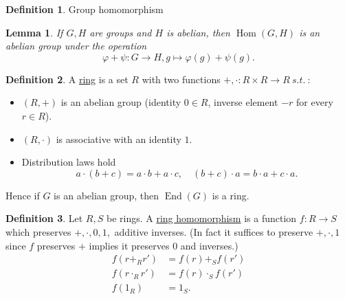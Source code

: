 \documentclass{article}
\newcommand{\st}{\ s.t.\ }
\def \Hom {\operatorname{Hom}}
\def \End {\operatorname{End}}
\newtheorem*{lemma}{Lemma}
\theoremstyle{definition}
\newtheorem*{definition}{Definition}
\theoremstyle{remark}
\begin{document}
\begin{definition}
  Group homomorphism
\end{definition}

\begin{lemma}
  If $G,H$ are groups and $H$ is abelian, then $\Hom(G,H)$ is an abelian group under the operation
  \[
  \varphi + \psi: G \to H, g \mapsto \varphi(g) + \psi(g).  
  \]
\end{lemma}

\begin{definition}
A \underline{ring} is a set $R$ with two functions $+, \cdot: R \times R \to R \st$:
\begin{itemize}
\item $(R,+)$ is an abelian group (identity $0 \in R$, inverse element $-r$ for every $r \in R$).
\item $(R, \cdot)$ is associative with an identity $1.$
\item Distribution laws hold
\[
a\cdot(b+c) = a\cdot b + a \cdot c,\quad (b+c) \cdot a = b \cdot a + c \cdot a.
\]
\end{itemize}
\end{definition}

Hence if $G$ is an abelian group, then $\End(G)$ is a ring.

\begin{definition}
Let $R, S$ be rings. A \underline{ring homomorphism} is a function $f: R \to S$ which preserves $+, \cdot, 0, 1,$ additive inverses. (In fact it suffices to preserve $+, \cdot, 1$ since $f$ preserves $+$ implies it preserves $0$ and inverses.)
\begin{align*}
f(r +_R r') & = f(r) +_S f(r') \\
f(r \cdot_R r') & = f(r) \cdot_S f(r') \\
f(1_R) & = 1_S.
\end{align*}
\end{definition}
\end{document}
